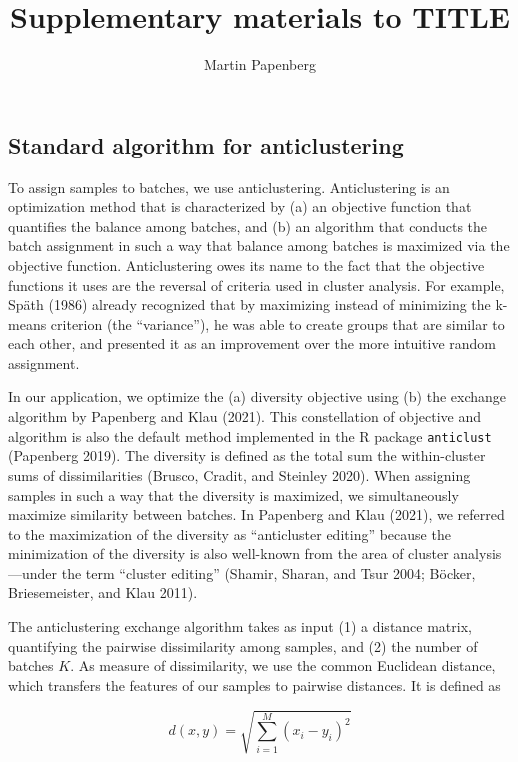 \documentclass[
]{article}
\title{Supplementary materials to TITLE}
\author{Martin Papenberg}
\date{}
\begin{document}
\maketitle

\subsection{Standard algorithm for
anticlustering}\label{standard-algorithm-for-anticlustering}

To assign samples to batches, we use anticlustering. Anticlustering is
an optimization method that is characterized by (a) an objective
function that quantifies the balance among batches, and (b) an algorithm
that conducts the batch assignment in such a way that balance among
batches is maximized via the objective function. Anticlustering owes its
name to the fact that the objective functions it uses are the reversal
of criteria used in cluster analysis. For example, Späth (1986) already
recognized that by maximizing instead of minimizing the k-means
criterion (the ``variance''), he was able to create groups that are
similar to each other, and presented it as an improvement over the more
intuitive random assignment.

In our application, we optimize the (a) diversity objective using (b)
the exchange algorithm by Papenberg and Klau (2021). This constellation
of objective and algorithm is also the default method implemented in the
R package \texttt{anticlust} (Papenberg 2019). The diversity is defined
as the total sum the within-cluster sums of dissimilarities (Brusco,
Cradit, and Steinley 2020). When assigning samples in such a way that
the diversity is maximized, we simultaneously maximize similarity
between batches. In Papenberg and Klau (2021), we referred to the
maximization of the diversity as ``anticluster editing'' because the
minimization of the diversity is also well-known from the area of
cluster analysis---under the term ``cluster editing'' (Shamir, Sharan,
and Tsur 2004; Böcker, Briesemeister, and Klau 2011).

The anticlustering exchange algorithm takes as input (1) a distance
matrix, quantifying the pairwise dissimilarity among samples, and (2)
the number of batches \(K\). As measure of dissimilarity, we use the
common Euclidean distance, which transfers the features of our samples
to pairwise distances. It is defined as

\[
d(x, y) =  \sqrt{\sum\limits_{i = 1}^{M}(x_i - y_i)^2}
\]
\end{document}
